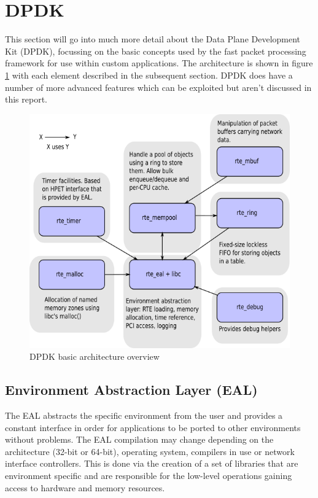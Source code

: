 \documentclass[final_report.tex]{subfiles}
\begin{document}
\section{DPDK}
\label{sec:dpdk}
This section will go into much more detail about the Data Plane Development Kit (DPDK), focussing on the basic concepts used by the fast packet processing framework for use within custom applications. The architecture is shown in figure \ref{fig:arch} with each element described in the subsequent section. DPDK does have a number of more advanced features which can be exploited but aren't discussed in this report.

\begin{figure}[H]
	\centering
	\includegraphics[width=\textwidth]{img/architecture-overview.png}
	\caption{DPDK basic architecture overview}
	\label{fig:arch}
\end{figure}

\newpage

\subsection{Environment Abstraction Layer (EAL)}
The EAL abstracts the specific environment from the user and provides a constant interface in order for applications to be ported to other environments without problems. The EAL compilation may change depending on the architecture (32-bit or 64-bit), operating system, compilers in use or network interface controllers. This is done via the creation of a set of libraries that are environment specific and are responsible for the low-level operations gaining access to hardware and memory resources.
\end{document}
